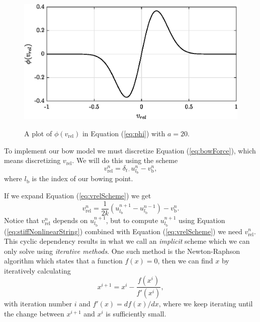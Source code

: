 \documentclass{article}
\begin{document}
\begin{figure}[h]
  \includegraphics[width=\linewidth]{bowplot.eps}
  \label{fig:bowplot}
  \caption{A plot of $\phi(v_\text{rel})$ in Equation (\ref{eq:phi}) with $a = 20$.}
\end{figure}
%
\noindent To implement our bow model we must discretize Equation (\ref{eq:bowForce}), which means discretizing $v_\text{rel}$.
We will do this using the scheme
\begin{equation}
  \label{eq:vrelScheme}
  v_\text{rel}^n = \delta_{t\cdot} u^n_{l_\text{b}} - v_\text{b}^n,
\end{equation}
where $l_\text{b}$ is the index of our bowing point.

If we expand Equation (\ref{eq:vrelScheme}) we get
\begin{equation}
  \label{eq:vrelSchemeExpanded}
  v_\text{rel}^n = \frac{1}{2k}\left(u^{n+1}_{l_\text{b}} - u^{n-1}_{l_\text{b}}\right) - v_\text{b}^n.
\end{equation}
Notice that $v_\text{rel}^n$ depends on $u^{n+1}_{l_\text{b}}$, but to compute $u^{n+1}_{l_\text{b}}$ using Equation (\ref{eq:stiffNonlinearString}) combined with Equation (\ref{eq:vrelScheme}) we need $v_\text{rel}^n$.
This cyclic dependency results in what we call an \textit{implicit} scheme which we can only solve using \textit{iterative methods}.
%
One such method is the Newton-Raphson algorithm which states that  a function $f(x) = 0$, then we can find  $x$ by iteratively calculating
\begin{equation}
  x^{i+1} = x^i - \frac{f(x^i)}{f'(x^i)},
\end{equation}
with iteration number $i$ and $f'(x) = df(x)/dx$, where we keep iterating until the change between $x^{i+1}$ and $x^i$ is sufficiently small.
\end{document}
